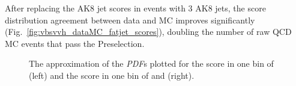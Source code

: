 After replacing the AK8 jet scores in events with 3 AK8 jets, the \ParticleNet score distribution agreement between data and MC improves significantly (Fig.~\ref{fig:vbsvvh_dataMC_fatjet_scores}), doubling the number of raw QCD MC events that pass the Preselection.

\begin{figure}[htb]
    \centering
    \qquad
    \caption[The approximation of the \ParticleNet \textit{PDF}s]{
        The approximation of the \ParticleNet \textit{PDF}s plotted for the \Xtobb score in one bin of \pt (left) and the \XWtoqq score in one bin of \pt and \Xtobb (right). 
    }
    \label{fig:vbsvvh_pnetpdf}
\end{figure}

